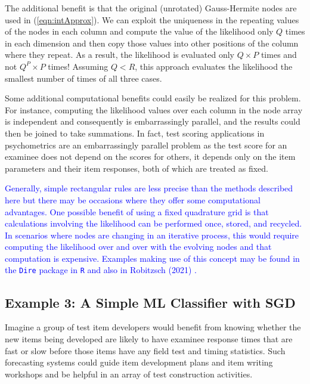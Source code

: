 \documentclass[12pt]{article}
\begin{document}
The additional benefit is that the original (unrotated) Gauss-Hermite nodes are used in (\ref{eqn:intApprox}). We can exploit the uniqueness in the repeating values of the nodes in each column and compute the value of the likelihood only $Q$ times in each dimension and then copy those values into other positions of the column where they repeat. As a result, the likelihood is evaluated only $Q \times P$ times and not $Q^P \times P$ times! Assuming $Q < R$, this approach evaluates the likelihood the smallest number of times of all three cases. 

Some additional computational benefits could easily be realized for this problem. For instance, computing the likelihood values over each column in the node array is independent and consequently is embarrassingly parallel, and the results could then be joined to take summations. In fact, test scoring applications in psychometrics are an embarrassingly parallel problem as the test score for an examinee does not depend on the scores for others, it depends only on the item parameters and their item responses, both of which are treated as fixed. 

\textcolor{blue}{Generally, simple rectangular rules are less precise than the methods described here but there may be occasions where they offer some computational advantages. One possible benefit of using a fixed quadrature grid is that calculations involving the likelihood can be performed once, stored, and recycled. In scenarios where nodes are changing in an iterative process, this would require computing the likelihood over and over with the evolving nodes and that computation is expensive. Examples making use of this concept may be found in the \texttt{Dire} package in \texttt{R} \cite{dire} and also in Robitzsch (2021) \nocite{robitzsch}.}

\subsection*{Example 3: A Simple ML Classifier with SGD}

Imagine a group of test item developers would benefit from knowing whether the new items being developed are likely to have examinee response times that are fast or slow before those items have any field test and timing statistics. Such forecasting systems could guide item development plans and item writing workshops and be helpful in an array of test construction activities. 
\end{document}
